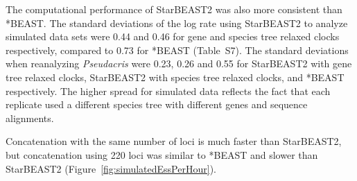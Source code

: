 \documentclass[nogrid]{MBE}%
\begin{document}
The computational performance of StarBEAST2 was also more consistent than
*BEAST. The standard deviations of the log rate using StarBEAST2 to analyze
simulated data sets were 0.44 and 0.46 for gene and species tree relaxed clocks
respectively, compared to 0.73 for *BEAST (Table~S7). The standard deviations
when reanalyzing \textit{Pseudacris} were 0.23, 0.26 and 0.55 for StarBEAST2
with gene tree relaxed clocks, StarBEAST2 with species tree relaxed clocks, and
*BEAST respectively. The higher spread for simulated data reflects the fact that
each replicate used a different species tree with different genes and sequence
alignments.

Concatenation with the same number of loci is much faster than StarBEAST2, but
concatenation using 220 loci was similar to *BEAST and slower than StarBEAST2
(Figure~\ref{fig:simulatedEssPerHour}).
\end{document}

